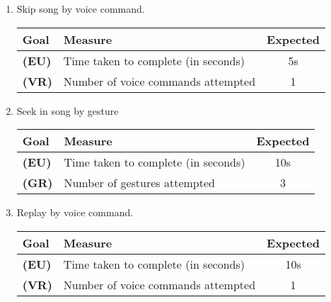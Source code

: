 \documentclass[12pt,letterpaper]{article}
\begin{document}
\begin{enumerate}

\item Skip song by voice command.
\begin{center}\begin{tabular}{l|l|c}
\textbf{Goal} & \textbf{Measure} & \textbf{Expected} \\
\hline
\textbf{(EU)} & Time taken to complete (in seconds) & 5s \\
\hline
\textbf{(VR)} & Number of voice commands attempted & 1 \\
\hline
\end{tabular}\end{center}

\item Seek in song by gesture
\begin{center}\begin{tabular}{l|l|c}
\textbf{Goal} & \textbf{Measure} & \textbf{Expected} \\
\hline
\textbf{(EU)} & Time taken to complete (in seconds) & 10s \\
\hline
\textbf{(GR)} & Number of gestures attempted & 3 \\
\hline
\end{tabular}\end{center}

\item Replay by voice command.
\begin{center}\begin{tabular}{l|l|c}
\textbf{Goal} & \textbf{Measure} & \textbf{Expected} \\
\hline
\textbf{(EU)} & Time taken to complete (in seconds) & 10s \\
\hline
\textbf{(VR)} & Number of voice commands attempted & 1 \\
\hline
\end{tabular}\end{center}


\end{enumerate}
\end{document}
